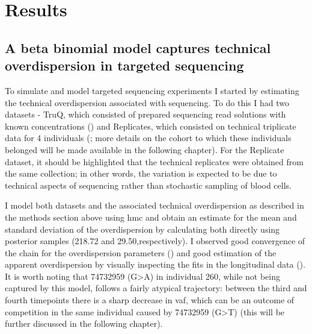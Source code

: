 \FloatBarrier

\section{Results}

\subsection{A beta binomial model captures technical overdispersion in targeted sequencing}

To simulate and model targeted sequencing experiments I started by estimating the technical overdispersion associated with sequencing. To do this I had two datasets - TruQ, which consisted of prepared sequencing read solutions with known concentrations () and Replicates, which consisted on technical triplicate data for 4 individuals (; more details on the cohort to which these individuals belonged will be made available in the following chapter). For the Replicate dataset, it should be highlighted that the technical replicates were obtained from the same collection; in other words, the variation is expected to be due to technical aspects of sequencing rather than stochastic sampling of blood cells. 

I model both datasets and the associated technical overdispersion as described in the methods section above using \ac{hmc} and obtain an estimate for the mean and standard deviation of the overdispersion by calculating both directly using posterior samples (218.72 and 29.50,respectively). I observed good convergence of the chain for the overdispersion parameters () and good estimation of the apparent overdispersion by visually inspecting the fits in the longitudinal data (). It is worth noting that 74732959 (G>A) in individual 260, while not being captured by this model, follows a fairly atypical trajectory: between the third and fourth timepoints there is a sharp decrease in \ac{vaf}, which can be an outcome of competition in the same individual caused by 74732959 (G>T) (this will be further discussed in the following chapter).

\begin{figure}[!h]
	\label{fig:truq-data}
\end{figure}

